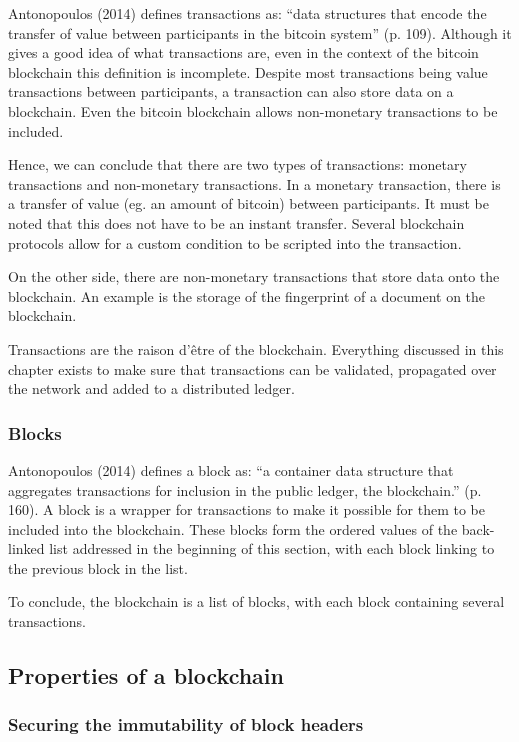 Antonopoulos (2014) \cite{antonopoulos:2014} defines transactions as: ``data structures that encode the transfer of value between participants in the bitcoin system'' (p. 109). Although it gives a good idea of what transactions are, even in the context of the bitcoin blockchain this definition is incomplete. Despite most transactions being value transactions between participants, a transaction can also store data on a blockchain. Even the bitcoin blockchain allows non-monetary transactions to be included.

Hence, we can conclude that there are two types of transactions: monetary transactions and non-monetary transactions. In a monetary transaction, there is a transfer of value (eg. an amount of bitcoin) between participants. It must be noted that this does not have to be an instant transfer. Several blockchain protocols allow for a custom condition to be scripted into the transaction.

On the other side, there are non-monetary transactions that store data onto the blockchain. An example is the storage of the fingerprint of a document on the blockchain.

Transactions are the raison d'\^{e}tre of the blockchain. Everything discussed in this chapter exists to make sure that transactions can be validated, propagated over the network and added to a distributed ledger.

\subsubsection{Blocks}

Antonopoulos (2014) \cite{antonopoulos:2014} defines a block as: ``a container data structure that aggregates transactions for inclusion in the public ledger, the blockchain.'' (p. 160). A block is a wrapper for transactions to make it possible for them to be included into the blockchain. These blocks form the ordered values of the back-linked list addressed in the beginning of this section, with each block linking to the previous block in the list.

To conclude, the blockchain is a list of blocks, with each block containing several transactions.

\subsection{Properties of a blockchain}

\subsubsection{Securing the immutability of block headers}

